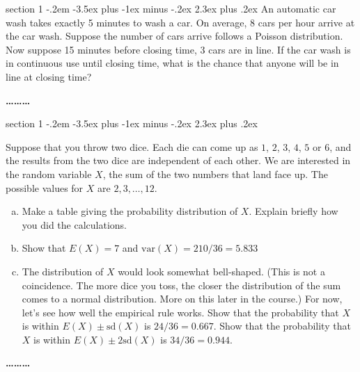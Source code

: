 \documentclass[11pt]{article}
\makeatletter
\newenvironment{problem}{\@startsection
       {section}
       {1}
       {-.2em}
       {-3.5ex plus -1ex minus -.2ex}
       {2.3ex plus .2ex}
       {\pagebreak[3]%
       \large\bf\noindent{Problem }
       }
       }
       {%
       \begin{center}\large\bf \ldots\ldots\ldots\end{center}}
\makeatother
\begin{document}
\begin{problem}{}
An automatic car wash takes exactly 5 minutes to wash a car. On average, 8 cars per hour arrive at the car wash.
Suppose the number of cars arrive follows a Poisson distribution. Now suppose 15 minutes before closing time, 3 cars are in line.
If the car wash is in continuous use until closing time, what is the chance that anyone will be in line at closing time?
\end{problem}

\begin{problem}{}
 
Suppose that you throw two dice. Each die can come up as $1$, $2$, $3$, $4$,
$5$ or $6$, and the results from the two dice are independent of each other.
We are interested in the random variable $X$, the sum of the two numbers that
land face up. The possible values for $X$ are $2, 3, \dotsc, 12$. 
 
\begin{enumerate}[(a)]

\item Make a table giving the probability distribution of $X$.  Explain
briefly how you did the calculations. 

\item Show that $E(X) = 7$ and $\mathrm{var}(X) = 210/36 = 5.833$

\item The distribution of $X$ would look somewhat bell-shaped. (This is not a coincidence. The more
dice you toss, the closer the distribution of the sum comes to a normal
distribution. More on this later in the course.) For now, let's see how well
the empirical rule works. Show that the probability that $X$ is within 
$E(X) \pm \mathrm{sd}(X)$ is $24/36=0.667$.  
Show that the probability that $X$ is within $E(X) \pm 2\mathrm{sd}(X)$ is $34/36=0.944$. 

\end{enumerate}

\end{problem}
\end{document}
